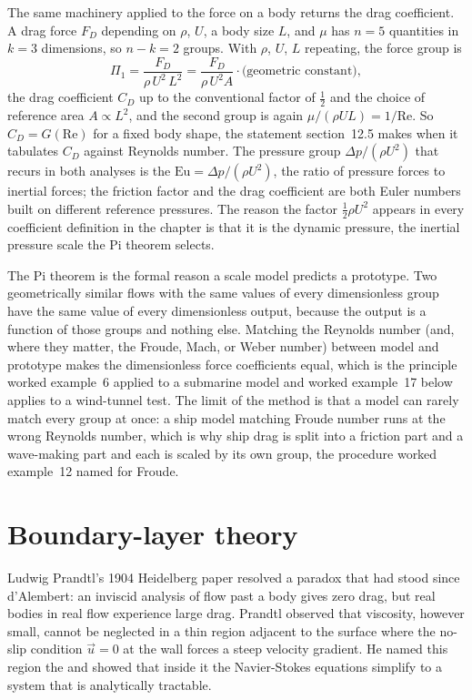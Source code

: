  The same
machinery applied to the force on a body returns the drag coefficient.
A drag force $F_D$ depending on $\rho$, $U$, a body size $L$, and $\mu$
has $n = 5$ quantities in $k = 3$ dimensions, so $n - k = 2$ groups.
With $\rho$, $U$, $L$ repeating, the force group is
\[
\Pi_1 = \frac{F_D}{\rho\,U^2\,L^2} = \frac{F_D}{\rho\,U^2 A}\cdot
\text{(geometric constant)},
\]
the drag coefficient $C_D$ up to the conventional factor of $\tfrac12$
and the choice of reference area $A\propto L^2$, and the second group
is again $\mu/(\rho U L) = 1/\text{Re}$. So $C_D = G(\text{Re})$ for a
fixed body shape, the statement section~12.5 makes when it tabulates
$C_D$ against Reynolds number. The pressure group $\Delta p/(\rho U^2)$
that recurs in both analyses is the 
$\text{Eu} = \Delta p/(\rho U^2)$, the ratio of pressure forces to
inertial forces; the friction factor and the drag coefficient are both
Euler numbers built on different reference pressures. The reason the
factor $\tfrac12\rho U^2$ appears in every coefficient definition in
the chapter is that it is the dynamic pressure, the inertial pressure
scale the Pi theorem selects.

 The Pi theorem is the formal
reason a scale model predicts a prototype. Two geometrically similar
flows with the same values of every dimensionless group have the same
value of every dimensionless output, because the output is a function
of those groups and nothing else. Matching the Reynolds number (and,
where they matter, the Froude, Mach, or Weber number) between model and
prototype makes the dimensionless force coefficients equal, which is
the principle worked example~6 applied to a submarine model and worked
example~17 below applies to a wind-tunnel test. The limit of the method
is that a model can rarely match every group at once: a ship model
matching Froude number runs at the wrong Reynolds number, which is why
ship drag is split into a friction part and a wave-making part and each
is scaled by its own group, the procedure worked example~12 named for
Froude.

\section{Boundary-layer theory}

Ludwig Prandtl's 1904 Heidelberg paper
\cite{paper:prandtl1904} resolved a paradox that had stood since
d'Alembert: an inviscid analysis of flow past a body gives zero
drag, but real bodies in real flow experience large drag. Prandtl
observed that viscosity, however small, cannot be neglected in a
thin region adjacent to the surface where the no-slip condition
$\vec{u} = 0$ at the wall forces a steep velocity gradient. He
named this region the  and showed that
inside it the Navier-Stokes equations simplify to a system that is
analytically tractable.

